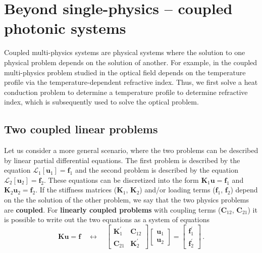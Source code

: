     \section{Beyond single-physics -- coupled photonic systems}\label{sec:coupled}

    Coupled multi-physics systems are physical systems where the solution to one physical 
    problem depends on the solution of another. For example, in the coupled multi-physics 
    problem studied in \cite{ownpub0} the optical field depends on the temperature profile via
    the temperature-dependent refractive index. Thus, we first solve a heat conduction problem to determine
    a temperature profile to determine refractive index, which is subsequently used to solve the optical problem.
    \subsection*{Two coupled linear problems}
     Let us consider a more general scenario, where the two
    problems can be described by linear partial differential equations. The
    first problem
    is described by the equation $\mathcal{L}_1 [\mathbf{u}_1]= \mathbf{f}_1$ and
    the second problem is described by the
    equation $\mathcal{L}_2 [\mathbf{u}_2]= \mathbf{f}_2$. These equations can be
    discretized into the form $\mathbf{K}_1 \mathbf{u} = \mathbf{f}_1$ and $\mathbf{K}_2 \mathbf{u}_2 =
\mathbf{f}_2$.
    If the stiffness matrices ($\mathbf{K}_1$, $\mathbf{K}_2$) and/or loading terms ($\mathbf{f}_1$, $\mathbf{f}_2$) depend on the the solution of the
    other problem, we say that the two physics problems are
    \textbf{coupled}. For \textbf{linearly coupled problems} with coupling terms ($\mathbf{C}_{12}$, $\mathbf{C}_{21}$) it is possible to write out the two equations as a system of equations
    \begin{equation}\label{eq:c_N_2}
        \mathbf{K} \mathbf{u} = \mathbf{f} \quad \longleftrightarrow \quad 
        \begin{bmatrix}
            \mathbf{K}^\prime_1  & \mathbf{C}_{12} \\
            \mathbf{C}_{21} & \mathbf{K}^\prime_2
        \end{bmatrix}
        \begin{bmatrix}
            \mathbf{u}_1 \\
            \mathbf{u}_2
        \end{bmatrix}
        =
        \begin{bmatrix}
            \mathbf{f}_1^\prime \\
            \mathbf{f}_2^\prime
        \end{bmatrix}\,.
    \end{equation}
